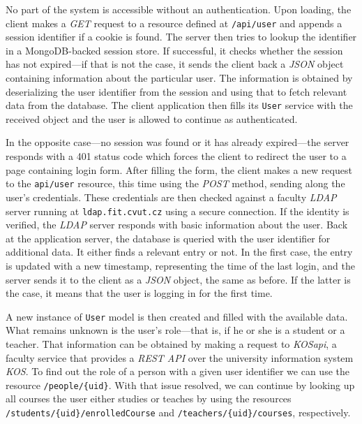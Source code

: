 \documentclass[thesis=M,english,hidelinks]{FITthesis}[2012/10/20]
\newcommand{\code}{\texttt}
\begin{document}
No part of the system is accessible without an authentication. Upon loading, the client makes a \textit{GET} request to a resource defined at \code{/api/user} and appends a session identifier if a cookie is found. The server then tries to lookup the identifier in a MongoDB-backed session store. If successful, it checks whether the session has not expired---if that is not the case, it sends the client back a \textit{JSON} object containing information about the particular user. The information is obtained by deserializing the user identifier from the session and using that to fetch relevant data from the database. The client application then fills its \code{User} service with the received object and the user is allowed to continue as authenticated.

In the opposite case---no session was found or it has already expired---the server responds with a 401 status code which forces the client to redirect the user to a page containing login form. After filling the form, the client makes a new request to the \code{api/user} resource, this time using the \textit{POST} method, sending along the user's credentials. These credentials are then checked against a faculty \textit{LDAP} server running at \code{ldap.fit.cvut.cz} using a secure connection. If the identity is verified, the \textit{LDAP} server responds with basic information about the user. Back at the application server, the database is queried with the user identifier for additional data. It either finds a relevant entry or not. In the first case, the entry is updated with a new timestamp, representing the time of the last login, and the server sends it to the client as a \textit{JSON} object, the same as before. If the latter is the case, it means that the user is logging in for the first time.

A new instance of \code{User} model is then created and filled with the available data. What remains unknown is the user's role---that is, if he or she is a student or a teacher. That information can be obtained by making a request to \textit{KOSapi}, a faculty service that provides a \textit{REST API} over the university information system \textit{KOS}. To find out the role of a person with a given user identifier we can use the resource \code{/people/\{uid\}}. With that issue resolved, we can continue by looking up all courses the user either studies or teaches by using the resources \code{/students/\{uid\}/enrolledCourse} and \code{/teachers/\{uid\}/courses}, respectively.

\end{document}
